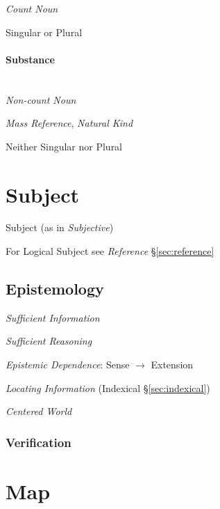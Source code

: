 \emph{Count Noun}

Singular or Plural



\paragraph{Substance}\label{sec:substance}
\hfill \\

\emph{Non-count Noun}

\emph{Mass Reference}, \emph{Natural Kind}

Neither Singular nor Plural



\section{Subject}\label{sec:subject}

Subject (as in \emph{Subjective})

For Logical Subject see \emph{Reference} \S\ref{sec:reference}



\subsection{Epistemology}\label{sec:epistemology}
\cite{chalmers02}

\emph{Sufficient Information}

\emph{Sufficient Reasoning}

\emph{Epistemic Dependence}: Sense $\rightarrow$ Extension

\emph{Locating Information} (Indexical \S\ref{sec:indexical})

\emph{Centered World}



\subsubsection{Verification}\label{sec:verification}



\section{Map}\label{sec:map}


